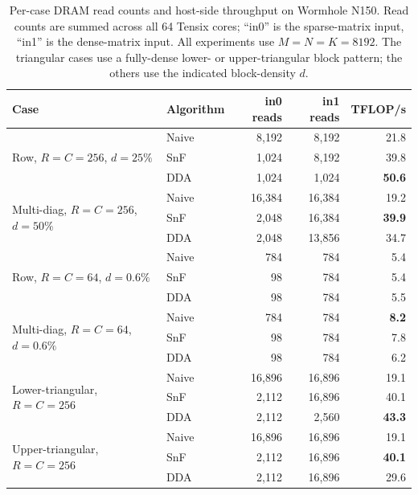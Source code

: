 %

\begin{table}[t]
\centering
\caption{Per-case DRAM read counts and host-side throughput on Wormhole N150.
Read counts are summed across all 64 Tensix cores; ``in0'' is the sparse-matrix
input, ``in1'' is the dense-matrix input. All experiments use $M=N=K=8192$.
The triangular cases use a fully-dense lower- or upper-triangular block
pattern; the others use the indicated block-density $d$.}
\label{tab:dda-vs-snf-dram-reads}
\begin{tabular}{llrrr}
\toprule
Case & Algorithm & in0 reads & in1 reads & TFLOP/s \\
\midrule
\multirow{3}{*}{Row, $R{=}C{=}256$, $d{=}25\%$}
  & Naive & 8{,}192 & 8{,}192 & 21.8 \\
  & SnF   & 1{,}024 & 8{,}192 & 39.8 \\
  & DDA   & 1{,}024 & 1{,}024 & \textbf{50.6} \\
\midrule
\multirow{3}{*}{Multi-diag, $R{=}C{=}256$, $d{=}50\%$}
  & Naive & 16{,}384 & 16{,}384 & 19.2 \\
  & SnF   & 2{,}048  & 16{,}384 & \textbf{39.9} \\
  & DDA   & 2{,}048  & 13{,}856 & 34.7 \\
\midrule
\multirow{3}{*}{Row, $R{=}C{=}64$, $d{=}0.6\%$}
  & Naive & 784 & 784 & 5.4 \\
  & SnF   & 98  & 784 & 5.4 \\
  & DDA   & 98  & 784 & 5.5 \\
\midrule
\multirow{3}{*}{Multi-diag, $R{=}C{=}64$, $d{=}0.6\%$}
  & Naive & 784 & 784 & \textbf{8.2} \\
  & SnF   & 98  & 784 & 7.8 \\
  & DDA   & 98  & 784 & 6.2 \\
\midrule
\multirow{3}{*}{Lower-triangular, $R{=}C{=}256$}
  & Naive & 16{,}896 & 16{,}896 & 19.1 \\
  & SnF   & 2{,}112  & 16{,}896 & 40.1 \\
  & DDA   & 2{,}112  & 2{,}560  & \textbf{43.3} \\
\midrule
\multirow{3}{*}{Upper-triangular, $R{=}C{=}256$}
  & Naive & 16{,}896 & 16{,}896 & 19.1 \\
  & SnF   & 2{,}112  & 16{,}896 & \textbf{40.1} \\
  & DDA   & 2{,}112  & 16{,}896 & 29.6 \\
\bottomrule
\end{tabular}
\end{table}
